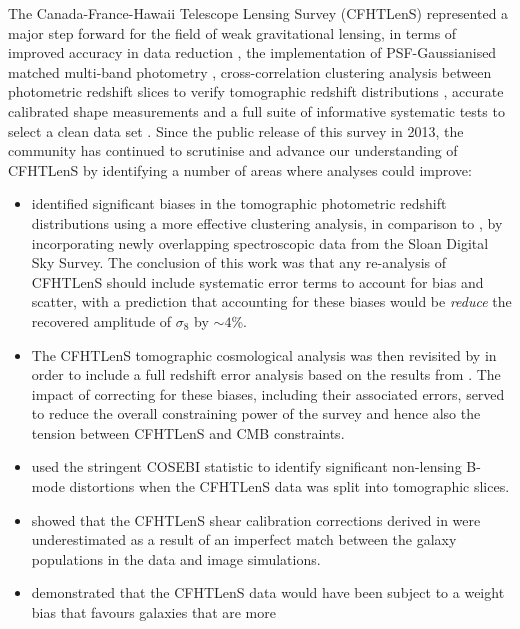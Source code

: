 The Canada-France-Hawaii Telescope Lensing Survey (CFHTLenS) represented a
major step forward for the field of weak gravitational lensing, in terms of
improved accuracy in data reduction \citep{CFHTLenS-data}, the implementation
of PSF-Gaussianised matched multi-band photometry
\citep{CFHTLenS-photoz}, cross-correlation clustering analysis between
photometric redshift slices to verify tomographic redshift distributions
\citep{CFHTLenS-2pt-tomo}, accurate calibrated shape measurements
\citep{CFHTLenS-shapes} and a full suite of informative systematic tests to
select a clean data set \citep{CFHTLenS-sys}. Since the public release
of this survey in 2013, the community has continued to scrutinise and advance
our understanding of CFHTLenS by identifying a number of areas where analyses
could improve:
%
\begin{itemize}
%
 \item{\citet{2016MNRAS.463.3737C} identified significant biases in the tomographic
photometric redshift distributions using a more effective clustering analysis,
in comparison to \citet{CFHTLenS-2pt-tomo}, by incorporating newly overlapping
spectroscopic data from the Sloan Digital Sky Survey.  The conclusion of this
work was that any re-analysis of CFHTLenS should include systematic error terms
to account for bias and scatter, with a prediction that accounting for these
biases would be {\it reduce} the recovered amplitude of $\sigma_8$ by $\sim
4$\%. }
%
\item{ The CFHTLenS tomographic cosmological analysis was then revisited by
\citet{joudaki/etal:2016} in order to include a full redshift error analysis
based on the results from \citet{2016MNRAS.463.3737C}.  The impact of
correcting for these biases, including their associated errors, served to
reduce the overall constraining power of the survey and hence also the tension
between CFHTLenS and CMB constraints.}
%
 \item{\citet{2016arXiv160100115A} used the stringent COSEBI statistic
\cite{COSEBIs} to identify significant non-lensing B-mode distortions when the
CFHTLenS data was split into tomographic slices.}
%
\item{\citet{2015MNRAS.454.3500K} showed that the CFHTLenS shear calibration
corrections derived in \citet{CFHTLenS-shapes} were underestimated as a result
of an imperfect match between the galaxy populations in the data and image
simulations.}
%
\item{\citet{2016arXiv160605337F} demonstrated that the CFHTLenS data would
have been subject to a weight bias that favours galaxies that are more
}
\end{itemize}
